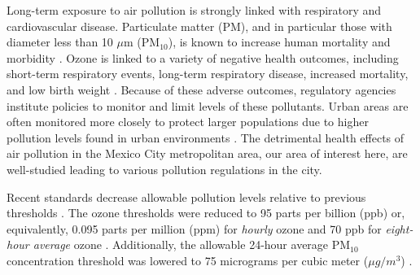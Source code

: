 \documentclass[alpha-refs]{wiley-article}
\begin{document}
Long-term exposure to air pollution is strongly linked with respiratory and cardiovascular disease.
Particulate matter (PM), and in particular those with diameter less than 10 $\mu$m ($\text{PM}_{10}$), is known to increase human mortality and morbidity \citep[see, e.g.,][]{brunekreef2002,pope2006,loomis2013,hoek2013}.
Ozone is linked to a variety of negative health outcomes, including short-term respiratory events, long-term respiratory disease, increased mortality, and low birth weight \citep[see, e.g.,][]{lippmann1989,salam2005,bell2006,weschler2006}. Because of these adverse outcomes, regulatory agencies institute policies to monitor and limit levels of these pollutants. Urban areas are often monitored more closely to protect larger populations due to higher pollution levels found in urban environments \citep[see, e.g.,][]{heal2014}. The detrimental health effects of air pollution in the Mexico City metropolitan area, our area of interest here, are well-studied \citep[see][]{mage1996,romieu1996,hernandez1997,loomis1999,bravo2002,barraza2008,riojas2014} leading to various pollution regulations in the city.


Recent standards  decrease allowable pollution levels relative to previous thresholds \citep{nom14a,nom14b}.
The ozone thresholds were reduced to 95 parts per billion (ppb) or, equivalently, 0.095 parts per million (ppm) for \emph{hourly}
ozone and 70 ppb for \emph{eight-hour average} ozone \citep{nom14b}. Additionally, the allowable 24-hour average $\text{PM}_{10}$ concentration threshold was lowered to 75 micrograms per cubic meter ($\mu g/m^3$) \citep{nom14a}.
\end{document}
